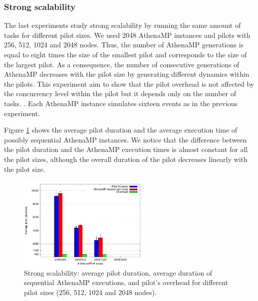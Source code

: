 

\subsubsection{Strong scalability}

The last experiments %
study strong scalability by running the same amount of tasks for different pilot sizes. We used
2048 AthenaMP instances and %
pilots with 256, 512, 1024 and 2048 nodes. Thus, the number of AthenaMP generations is equal to eight times the size of the smallest pilot and corresponds to the size of the largest pilot. As a consequence, the number of consecutive generations of AthenaMP decreases with the pilot size by generating different dynamics within the pilots. This experiment aim to show that the pilot overhead is not affected by the concurrency level within the pilot but it depends only on the number of tasks.  
. Each AthenaMP instance
simulates sixteen events as in the previous experiment.

Figure \ref{fig:strongScala} %
shows the average pilot duration and the average execution time of possibly
sequential AthenaMP instances.  We %
notice that the difference between the pilot duration and the AthenaMP execution
times is almost constant for all the pilot sizes, although the overall duration
of the pilot decreases linearly with the pilot size.

\begin{figure}[!htb]
        \includegraphics[height=4.5cm,width=\columnwidth]{./figures/NGE/strong.pdf}
    \caption{Strong scalability:  average pilot duration, average duration of
    sequential AthenaMP executions, and pilot's overhead for different pilot
    sizes (256, 512, 1024 and 2048 nodes).}
\label{fig:strongScala}
\end{figure}

